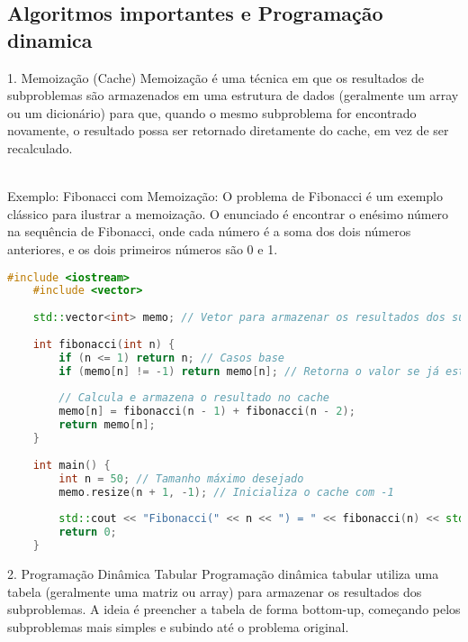 \documentclass{article}
\begin{document}
\subsection{Algoritmos importantes e Programação dinamica}

1. Memoização (Cache)
Memoização é uma técnica em que os resultados de subproblemas são armazenados em uma estrutura de dados (geralmente um array ou um dicionário) para que, quando o mesmo subproblema for encontrado novamente, o resultado possa ser retornado diretamente do cache, em vez de ser recalculado.

\\Exemplo: Fibonacci com Memoização: O problema de Fibonacci é um exemplo clássico para ilustrar a memoização. O enunciado é encontrar o enésimo número na sequência de Fibonacci, onde cada número é a soma dos dois números anteriores, e os dois primeiros números são 0 e 1.

\begin{lstlisting}[language=C++, caption=Fibonacci com Memoização]
    #include <iostream>
    #include <vector>
    
    std::vector<int> memo; // Vetor para armazenar os resultados dos subproblemas
    
    int fibonacci(int n) {
        if (n <= 1) return n; // Casos base
        if (memo[n] != -1) return memo[n]; // Retorna o valor se já estiver no cache
    
        // Calcula e armazena o resultado no cache
        memo[n] = fibonacci(n - 1) + fibonacci(n - 2);
        return memo[n];
    }
    
    int main() {
        int n = 50; // Tamanho máximo desejado
        memo.resize(n + 1, -1); // Inicializa o cache com -1
    
        std::cout << "Fibonacci(" << n << ") = " << fibonacci(n) << std::endl;
        return 0;
    }
\end{lstlisting}

2. Programação Dinâmica Tabular
Programação dinâmica tabular utiliza uma tabela (geralmente uma matriz ou array) para armazenar os resultados dos subproblemas. A ideia é preencher a tabela de forma bottom-up, começando pelos subproblemas mais simples e subindo até o problema original.
\end{document}
